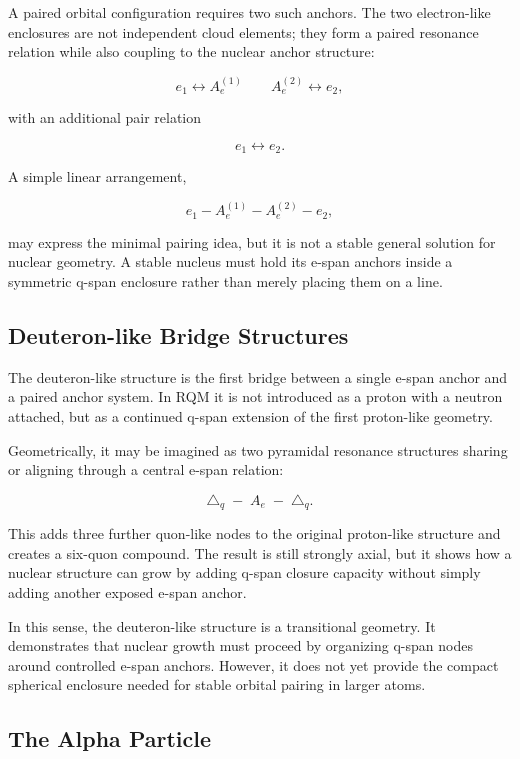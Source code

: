\documentclass[11pt,a4paper]{article}
\begin{document}
A paired orbital configuration requires two such anchors. The two electron-like enclosures are not independent cloud elements; they form a paired resonance relation while also coupling to the nuclear anchor structure:

\[
e_1 \leftrightarrow A_e^{(1)}
\qquad
A_e^{(2)} \leftrightarrow e_2 ,
\]

with an additional pair relation

\[
e_1 \leftrightarrow e_2 .
\]

A simple linear arrangement,

\[
e_1 - A_e^{(1)} - A_e^{(2)} - e_2 ,
\]

may express the minimal pairing idea, but it is not a stable general solution for nuclear geometry. A stable nucleus must hold its e-span anchors inside a symmetric q-span enclosure rather than merely placing them on a line.




\subsection{Deuteron-like Bridge Structures}

The deuteron-like structure is the first bridge between a single e-span anchor and a paired anchor system. In RQM it is not introduced as a proton with a neutron attached, but as a continued q-span extension of the first proton-like geometry.

Geometrically, it may be imagined as two pyramidal resonance structures sharing or aligning through a central e-span relation:

\[
\triangle_q \;-\; A_e \;-\; \triangle_q .
\]

This adds three further quon-like nodes to the original proton-like structure and creates a six-quon compound. The result is still strongly axial, but it shows how a nuclear structure can grow by adding q-span closure capacity without simply adding another exposed e-span anchor.

In this sense, the deuteron-like structure is a transitional geometry. It demonstrates that nuclear growth must proceed by organizing q-span nodes around controlled e-span anchors. However, it does not yet provide the compact spherical enclosure needed for stable orbital pairing in larger atoms.




\subsection{The Alpha Particle}
\end{document}
